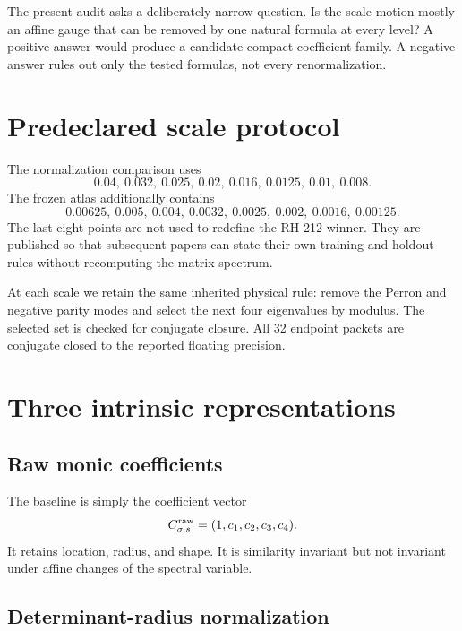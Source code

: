 \documentclass[12pt]{article}
\theoremstyle{remark}\newtheorem{remark}[theorem]{Remark}
\begin{document}
The present audit asks a deliberately narrow question.  Is the scale motion
mostly an affine gauge that can be removed by one natural formula at every
level?  A positive answer would produce a candidate compact coefficient
family.  A negative answer rules out only the tested formulas, not every
renormalization.

\section{Predeclared scale protocol}

The normalization comparison uses
\begin{equation}\label{eq:auditscales}
 0.04,\ 0.032,\ 0.025,\ 0.02,\ 0.016,\ 0.0125,\ 0.01,\ 0.008.
\end{equation}
The frozen atlas additionally contains
\begin{equation}\label{eq:extrascales}
 0.00625,\ 0.005,\ 0.004,\ 0.0032,\ 0.0025,\ 0.002,\ 0.0016,\ 0.00125.
\end{equation}
The last eight points are not used to redefine the RH-212 winner.  They are
published so that subsequent papers can state their own training and holdout
rules without recomputing the matrix spectrum.

At each scale we retain the same inherited physical rule: remove the Perron
and negative parity modes and select the next four eigenvalues by modulus.
The selected set is checked for conjugate closure.  All 32 endpoint packets
are conjugate closed to the reported floating precision.

\section{Three intrinsic representations}

\subsection{Raw monic coefficients}

The baseline is simply the coefficient vector
\begin{equation}
 C^{\rm raw}_{\sigma,s}=(1,c_1,c_2,c_3,c_4).
\end{equation}
It retains location, radius, and shape.  It is similarity invariant but not
invariant under affine changes of the spectral variable.

\subsection{Determinant-radius normalization}
\end{document}
